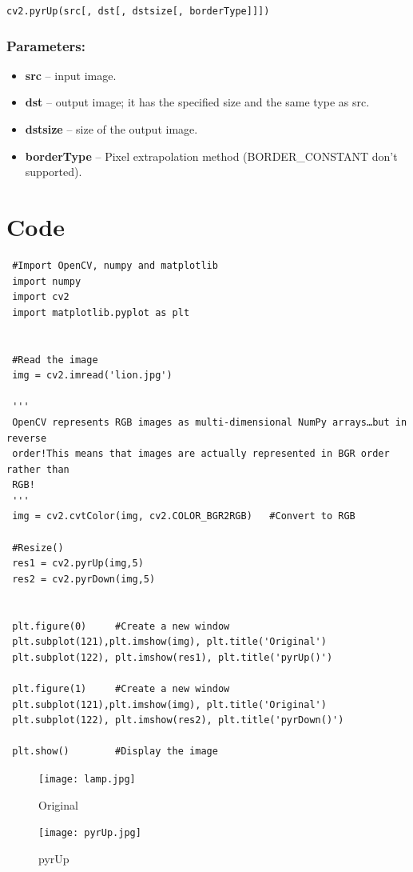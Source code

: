 \documentclass[]{article}
\providecommand{\tightlist}{%
  \setlength{\itemsep}{0pt}\setlength{\parskip}{0pt}}
\begin{document}
\texttt{cv2.pyrUp(src{[},\ dst{[},\ dstsize{[},\ borderType{]}{]}{]})}

\subsubsection{Parameters:}\label{parameters-1}

\begin{itemize}
\tightlist
\item
  \textbf{src} -- input image.
\item
  \textbf{dst} -- output image; it has the specified size and the same
  type as src.
\item
  \textbf{dstsize} -- size of the output image.
\item
  \textbf{borderType} -- Pixel extrapolation method (BORDER\_CONSTANT
  don't supported).
\end{itemize}

\section{Code}\label{code-1}

\begin{verbatim}
 #Import OpenCV, numpy and matplotlib
 import numpy
 import cv2
 import matplotlib.pyplot as plt


 #Read the image
 img = cv2.imread('lion.jpg')

 '''
 OpenCV represents RGB images as multi-dimensional NumPy arrays…but in reverse
 order!This means that images are actually represented in BGR order rather than
 RGB!
 '''
 img = cv2.cvtColor(img, cv2.COLOR_BGR2RGB)   #Convert to RGB

 #Resize()
 res1 = cv2.pyrUp(img,5)
 res2 = cv2.pyrDown(img,5)


 plt.figure(0)     #Create a new window
 plt.subplot(121),plt.imshow(img), plt.title('Original')
 plt.subplot(122), plt.imshow(res1), plt.title('pyrUp()')

 plt.figure(1)     #Create a new window
 plt.subplot(121),plt.imshow(img), plt.title('Original')
 plt.subplot(122), plt.imshow(res2), plt.title('pyrDown()')

 plt.show()        #Display the image
\end{verbatim}

\begin{figure}
\centering
\texttt{[image: lamp.jpg]} 
\caption{Original} 
\texttt{[image: pyrUp.jpg]}
\caption{pyrUp}
\end{figure}
\end{document}
